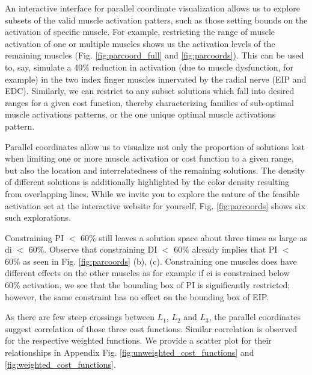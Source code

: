 \documentclass[10pt,letterpaper]{article}
\begin{document}
An interactive interface for parallel coordinate visualization allows us to explore subsets of the valid muscle activation patters, such as those setting bounds on the activation of specific muscle. For example, restricting the range of muscle activation of one or multiple muscles shows us the activation levels of the remaining muscles (Fig. \ref{fig:parcoord_full} and \ref{fig:parcoords}).
This can be used to, say, simulate  a 40\% reduction in activation (due to muscle dysfunction, for example) in the two index finger muscles innervated by the radial nerve (EIP and EDC). Similarly, we can restrict to any subset solutions which fall into desired ranges for a given cost function, thereby characterizing families of sub-optimal muscle activations patterns, or the one unique optimal muscle activations pattern.

Parallel coordinates allow us to visualize not only the proportion of solutions lost when limiting one or more muscle activation or cost function to a given range, but also the location and interrelatedness of the remaining solutions. The density of different solutions is additionally highlighted by the color density resulting from  overlapping  lines. While we invite you to explore the nature of the feasible activation set at the interactive website for yourself, Fig. \ref{fig:parcoords} shows six such explorations.



Constraining PI $<$ 60\% still leaves a solution space about three times as large as di $<$ 60\%. 
Observe that constraining DI $<$ 60\% already implies that PI $<$ 60\% as seen in Fig. \ref{fig:parcoords} (b), (c). 
Constraining one muscles does have different effects on the other muscles as for example if ei is constrained below 60\% activation, we see that the bounding box of PI is significantly restricted; however, the same constraint has no effect on the bounding box of EIP.

As there are few steep crossings between $L_1$, $L_2$ and $L_3$, the parallel coordinates suggest correlation of those three cost functions.
Similar correlation is observed for the respective weighted functions.
We provide a scatter plot for their relationships in Appendix Fig. \ref{fig:unweighted_cost_functions} and \ref{fig:weighted_cost_functions}.

\end{document}
